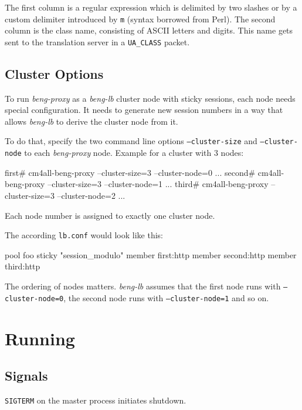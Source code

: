 \documentclass[a4paper,12pt]{article}
\begin{document}
The first column is a regular expression which is delimited by two
slashes or by a custom delimiter introduced by \texttt{m} (syntax
borrowed from Perl).  The second column is the class name, consisting
of ASCII letters and digits.  This name gets sent to the translation
server in a \verb|UA_CLASS| packet.

\subsection{Cluster Options}

To run \emph{beng-proxy} as a \emph{beng-lb} cluster node with sticky
sessions, each node needs special configuration.  It needs to generate
new session numbers in a way that allows \emph{beng-lb} to derive the
cluster node from it.

To do that, specify the two command line options
\texttt{--cluster-size} and \texttt{--cluster-node} to each
\emph{beng-proxy} node.  Example for a cluster with 3 nodes:

\begin{verbatim*}
first# cm4all-beng-proxy --cluster-size=3 --cluster-node=0 ...
second# cm4all-beng-proxy --cluster-size=3 --cluster-node=1 ...
third# cm4all-beng-proxy --cluster-size=3 --cluster-node=2 ...
\end{verbatim*}

Each node number is assigned to exactly one cluster node.

The according \texttt{lb.conf} would look like this:

\begin{verbatim*}
pool foo {
  sticky "session_modulo"
  member first:http
  member second:http
  member third:http
}
\end{verbatim*}

The ordering of nodes matters.  \emph{beng-lb} assumes that the first
node runs with \texttt{--cluster-node=0}, the second node runs with
\texttt{--cluster-node=1} and so on.

\section{Running}

\subsection{Signals}

\texttt{SIGTERM} on the master process initiates shutdown.
\end{document}
